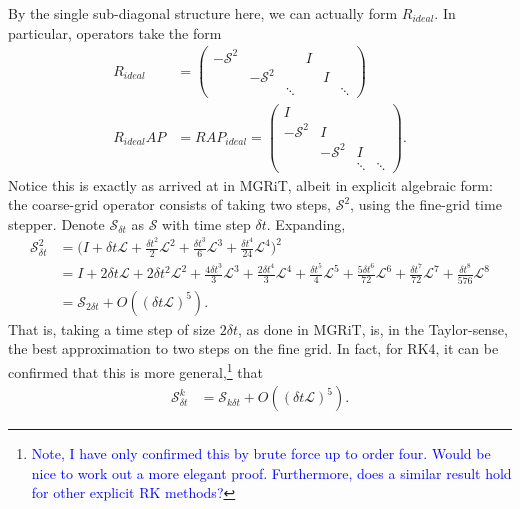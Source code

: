 \documentclass[a4paper,12pt]{article}
\newcommand{\tcb}{\textcolor{blue}}
\begin{document}
By the single sub-diagonal structure here, we can actually form $R_{ideal}$. In particular, operators take the form
%
\begin{align}
R_{ideal} & = \begin{pmatrix}-\mathcal{S}^2 & & & I & \\ & -\mathcal{S}^2 & & & I \\ & & \ddots & & & \ddots\end{pmatrix} \label{eq:ridealS}\\
R_{ideal}AP &= RAP_{ideal} = \begin{pmatrix} I \\ -\mathcal{S}^2 & I \\ & -\mathcal{S}^2 & I \\ & & \ddots & \ddots \end{pmatrix}.\label{eq:rapS}
\end{align}
%
Notice this is exactly as arrived at in MGRiT, albeit in explicit algebraic form: the coarse-grid operator consists of taking two steps,
$\mathcal{S}^2$, using the fine-grid time stepper. Denote $\mathcal{S}_{\delta t}$ as $\mathcal{S}$ with time step $\delta t$. Expanding, 
%
\begin{align*}
\mathcal{S}_{\delta t}^2 & = \Big( I + \delta t\mathcal{L} + \tfrac{\delta t^2}{2}\mathcal{L}^2 + \tfrac{\delta t^3}{6}\mathcal{L}^3 +
	\tfrac{\delta t^4}{24}\mathcal{L}^4\Big)^2 \\
& = I + 2 \delta t \mathcal{L} + 2 \delta t^2\mathcal{L}^2 +  \tfrac{4\delta t^3}{3}\mathcal{L}^3 + \tfrac{2\delta t^4}{3}\mathcal{L}^4 + \tfrac{\delta t^5}{4}\mathcal{L}^5 + \tfrac{5\delta t^6}{72}\mathcal{L}^6 + \tfrac{\delta t^7}{72}\mathcal{L}^7 + \tfrac{\delta t^8}{576} \mathcal{L}^8 \\
& = \mathcal{S}_{2\delta t} + O((\delta t\mathcal{L})^5).
\end{align*}
%
That is, taking a time step of size $2\delta t$, as done in MGRiT, is, in the Taylor-sense, the best approximation to two steps on 
the fine grid. In fact, for RK4, it can be confirmed that this is more general,\footnote{\tcb{Note, I have only confirmed this by brute
force up to order four. Would be nice to work out a more elegant proof. Furthermore, does a similar result hold for other explicit
RK methods?}} that 
%
\begin{align*}
\mathcal{S}_{\delta t}^k & = \mathcal{S}_{k\delta t} + O((\delta t\mathcal{L})^5).
\end{align*}
%
\end{document}
